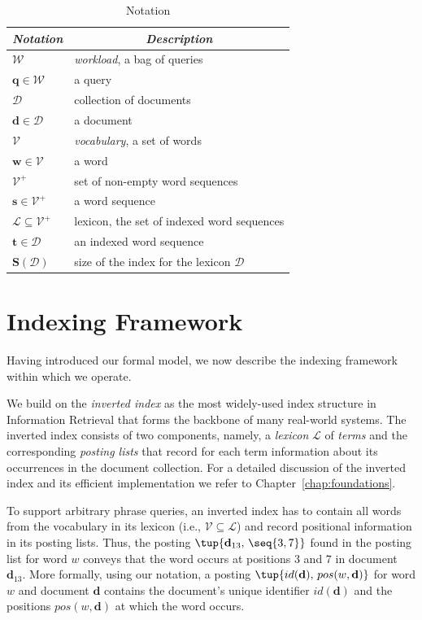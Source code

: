 %
\begin{table}
\centering
\begin{tabular}{ll}
\hline  
\multicolumn{1}{c}{\emph{Notation}} &  \multicolumn{1}{c}{\emph{Description}} \\
\hline
$\mathcal{W}$ & \emph{workload}, a bag of queries\\
$\mathbf{q} \in \mathcal{W}$ & a query\\
$\mathcal{D}$ & collection of documents\\
$\mathbf{d} \in \mathcal{D}$ & a document\\
$\mathcal{V}$ & \emph{vocabulary}, a set of words\\
$\mathbf{w} \in \mathcal{V}$ & a word\\
$\mathcal{V^+}$ & set of non-empty word sequences\\
$\mathbf{s} \in \mathcal{V^+}$ & a word sequence\\
$\mathcal{L} \subseteq \mathcal{V^+}$ & lexicon, the set of indexed word sequences\\
$\mathbf{t} \in \mathcal{D}$ & an indexed word sequence\\
$\mathbf{S}(\mathcal{D})$ & size of the index for the lexicon $\mathcal{D}$ \\
\hline
\end{tabular}

\caption{Notation}\label{chap:phrases:tab:notation}
\end{table}

\section{Indexing Framework}
\label{sec:augm-invert-index}

Having introduced our formal model, we now describe the indexing
framework within which we operate.

We build on the \emph{inverted index} as the most widely-used index
structure in Information Retrieval that forms the backbone of many
real-world systems. The inverted index consists of two components,
namely, a \emph{lexicon} $\mathcal{L}$ of \emph{terms} and
the corresponding \emph{posting lists} that record for each term
information about its occurrences in the document collection. For a
detailed discussion of the inverted index and its efficient
implementation we refer to Chapter~\ref{chap:foundations}.

To support arbitrary phrase queries, an inverted index has to contain
all words from the vocabulary in its lexicon (i.e.,
$\mathcal{V} \subseteq \mathcal{L}$) and record positional information
in its posting lists. Thus, the posting
$\tup{\mathbf{d}_{13},\,\seq{3, 7}}$ found in the posting list for
word $w$ conveys that the word occurs at positions $3$ and $7$ in
document $\mathbf{d}_{13}$. More formally, using our notation, a
posting $\tup{id(\mathbf{d}),\,pos(w,\mathbf{d})}$ for word $w$ and
document $\mathbf{d}$ contains the document's unique identifier
$id(\mathbf{d})$ and the positions $pos(w, \mathbf{d})$ at which the
word occurs.

